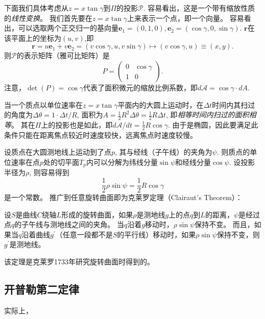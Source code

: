 \documentclass{article}
\begin{document}
下面我们具体考虑从$z=x\tan\gamma$到$\Pi$的投影$\mathcal{P}$.
容易看出，这是一个带有缩放性质的\emph{线性变换}。
我们首先要在$z=x\tan\gamma$上来表示一个点，即一个向量。
容易看出，可以选取两个正交归一的基向量$\mathbf{e}_{1}=(0, 1, 0),\mathbf{e}_{2}=(\cos\gamma, 0, \sin\gamma)$.
$\mathbf{r}$在该平面上的坐标为$(u, v)$,即
\begin{equation*}
    \mathbf{r}
    =u\mathbf{e}_{1}+v\mathbf{e}_{2}
    =(v\cos\gamma, u, v\sin\gamma)
    \longmapsto
    (v\cos\gamma, u)
    \equiv(x, y).
\end{equation*}
则$\mathcal{P}$的表示矩阵（雅可比矩阵）是
\begin{equation*}
    P=
    \begin{pmatrix}
        0 & \cos\gamma \\
        1 & 0
    \end{pmatrix}.
\end{equation*}
注意，$\det(P)=\cos\gamma$代表了面积微元的缩放比例系数，即$d\mathcal{A}=\cos\gamma\cdot{dA}$.

当一个质点以单位速率在$z=x\tan\gamma$平面内的大圆上运动时，在$\Delta{t}$时间内其扫过的角度为$\Delta\theta=1\cdot\Delta{t}/R$, 面积为$A=\frac{1}{2}R^{2}\Delta\theta=\frac{1}{2}R\Delta{t}$, 即\emph{相等时间内扫过的面积相等}。
其在$\Pi$上的投影也是如此，即$d\mathcal{A}/dt=\frac{1}{2}R\cos\gamma$.
由于是椭圆，因此要满足此条件只能在距离焦点较近时速度较快，远离焦点时速度较慢。

设质点在大圆测地线上运动到了点$p$, 其与经线（子午线）的夹角为$\psi$.
则质点的单位速率在点$p$处的切平面$T_{p}$内可以分解为纬线分量$\sin\psi$和经线分量$\cos\psi$.
设投影半径为$\rho$, 则容易得到
\begin{equation*}
    \frac{1}{2}\rho\sin\psi
    =\frac{1}{2}R\cos\gamma
\end{equation*}
是一个常数。
推广到任意旋转曲面即为克莱罗定理（Clairaut’s Theorem）：
\begin{tcolorbox}[colback=white, arc=3mm, auto outer arc]
\begin{minipage}[c,t]{1.0\textwidth}
\kaishu
设$S$是曲线$C$绕轴$L$形成的旋转曲面，如果$\rho$是测地线$g$上的点$q$到$L$的距离，$\psi$是经过点$q$的子午线与测地线之间的夹角。
当$q$沿着$g$移动时，$\rho\sin\psi$保持不变。
而且，如果当$q$沿着曲线$g^{\prime}$（任意一段都不是$S$的平行线）移动时，如果$\rho\sin\psi$保持不变，则$g^{\prime}$是测地线。
\end{minipage}
\end{tcolorbox}
该定理是克莱罗1733年研究旋转曲面时得到的。

\subsection{开普勒第二定律}

实际上，

%
%
\end{document}
